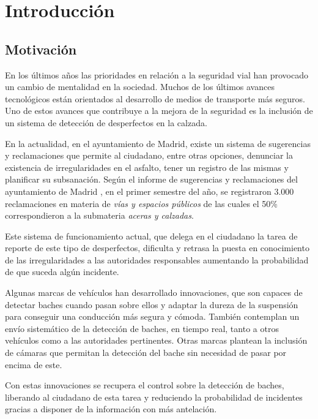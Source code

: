 \section{Introducción}

\subsection{Motivación}

En los últimos años las prioridades en relación a la seguridad vial han provocado un cambio de mentalidad en la sociedad.  Muchos de los últimos avances tecnológicos están orientados al desarrollo de medios de transporte más seguros. Uno de estos avances que contribuye a la mejora de la seguridad es la inclusión de un sistema de detección de desperfectos en la calzada.

En la actualidad, en el ayuntamiento de Madrid, existe un sistema de sugerencias y reclamaciones \cite{s1_syr} que permite al ciudadano, entre otras opciones, denunciar la existencia de irregularidades en el asfalto, tener un registro de las mismas y planificar su subsanación. Según el informe de sugerencias y reclamaciones del ayuntamiento de Madrid \cite{s1_syrreport}, en el primer semestre del año, se registraron 3.000 reclamaciones en materia de \textit{vías y espacios públicos} de las cuales el 50\% correspondieron a la submateria \textit{aceras y calzadas}.

Este sistema de funcionamiento actual, que delega en el ciudadano la tarea de reporte de este tipo de desperfectos, dificulta y retrasa la puesta en conocimiento de las irregularidades a las autoridades responsables aumentando la probabilidad de que suceda algún incidente.

Algunas marcas de vehículos han desarrollado innovaciones, que son capaces de detectar baches cuando pasan sobre ellos y adaptar la dureza de la suspensión para conseguir una conducción más segura y cómoda. También contemplan un envío sistemático de la detección de baches, en tiempo real, tanto a otros vehículos como a las autoridades pertinentes. Otras marcas plantean la inclusión de cámaras que permitan la detección del bache sin necesidad de pasar por encima de este.

Con estas innovaciones se recupera el control sobre la detección de baches, liberando al ciudadano de esta tarea y reduciendo la probabilidad de incidentes gracias a disponer de la información con más antelación.


